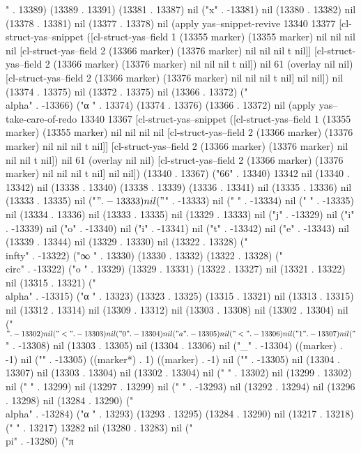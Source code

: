 {" . 13389) (13389 . 13391) (13381 . 13387) nil ("x" . -13381) nil (13380 . 13382) nil (13378 . 13381) nil (13377 . 13378) nil (apply yas--snippet-revive 13340 13377 [cl-struct-yas--snippet ([cl-struct-yas--field 1 (13355 marker) (13355 marker) nil nil nil nil [cl-struct-yas--field 2 (13366 marker) (13376 marker) nil nil nil t nil]] [cl-struct-yas--field 2 (13366 marker) (13376 marker) nil nil nil t nil]) nil 61 (overlay nil nil) [cl-struct-yas--field 2 (13366 marker) (13376 marker) nil nil nil t nil] nil nil]) nil (13374 . 13375) nil (13372 . 13375) nil (13366 . 13372) ("\\alpha" . -13366) ("α
" . 13374) (13374 . 13376) (13366 . 13372) nil (apply yas--take-care-of-redo 13340 13367 [cl-struct-yas--snippet ([cl-struct-yas--field 1 (13355 marker) (13355 marker) nil nil nil nil [cl-struct-yas--field 2 (13366 marker) (13376 marker) nil nil nil t nil]] [cl-struct-yas--field 2 (13366 marker) (13376 marker) nil nil nil t nil]) nil 61 (overlay nil nil) [cl-struct-yas--field 2 (13366 marker) (13376 marker) nil nil nil t nil] nil nil]) (13340 . 13367) ("66" . 13340) 13342 nil (13340 . 13342) nil (13338 . 13340) (13338 . 13339) (13336 . 13341) nil (13335 . 13336) nil (13333 . 13335) nil ("$" . -13333) nil ("$" . -13333) nil ("
" . -13334) nil (" " . -13335) nil (13334 . 13336) nil (13333 . 13335) nil (13329 . 13333) nil ("j" . -13329) nil ("i" . -13339) nil ("o" . -13340) nil ("i" . -13341) nil ("t" . -13342) nil ("e" . -13343) nil (13339 . 13344) nil (13329 . 13330) nil (13322 . 13328) ("\\infty" . -13322) ("∞
" . 13330) (13330 . 13332) (13322 . 13328) ("\\circ" . -13322) ("o
" . 13329) (13329 . 13331) (13322 . 13327) nil (13321 . 13322) nil (13315 . 13321) ("\\alpha" . -13315) ("α
" . 13323) (13323 . 13325) (13315 . 13321) nil (13313 . 13315) nil (13312 . 13314) nil (13309 . 13312) nil (13303 . 13308) nil (13302 . 13304) nil ("$" . -13302) nil ("<" . -13303) nil ("0" . -13304) nil ("a" . -13305) nil ("<" . -13306) nil ("1" . -13307) nil ("$" . -13308) nil (13303 . 13305) nil (13304 . 13306) nil ("_" . -13304) ((marker) . -1) nil ("}" . -13305) ((marker*) . 1) ((marker) . -1) nil ("{" . -13305) nil (13304 . 13307) nil (13303 . 13304) nil (13302 . 13304) nil (" " . 13302) nil (13299 . 13302) nil ("
" . 13299) nil (13297 . 13299) nil (" " . -13293) nil (13292 . 13294) nil (13296 . 13298) nil (13284 . 13290) ("\\alpha" . -13284) ("α
" . 13293) (13293 . 13295) (13284 . 13290) nil (13217 . 13218) ("  " . 13217) 13282 nil (13280 . 13283) nil ("\\pi" . -13280) ("π
}
